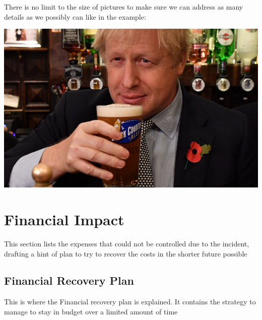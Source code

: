 \documentclass[a4paper,12pt]{article}
\begin{document}
There is no limit to the size of pictures to make sure we can address as many details as we possibly can like in the example:


\includegraphics[width=15cm]{./boris-pintoflager.jpeg}

\Large
\section{Financial Impact}
\normalsize
This section lists the expenses that could not be controlled due to the incident, drafting a hint of plan to try to recover the costs in the shorter future possible

\Large
\subsection {Financial Recovery Plan}
\normalsize
This is where the Financial recovery plan is explained. It contains the strategy to manage to stay in budget over a limited amount of time

\printindex
\end{document}
